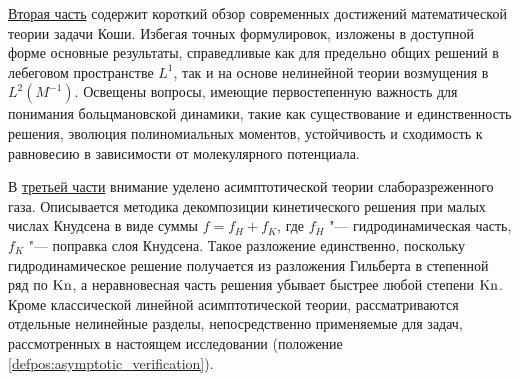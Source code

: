 \underline{Вторая часть} содержит короткий обзор современных достижений математической теории задачи Коши.
Избегая точных формулировок, изложены в доступной форме основные результаты,
справедливые как для предельно общих решений в лебеговом пространстве \(L^1\),
так и на основе нелинейной теории возмущения в \(L^2(M^{-1})\).
Освещены вопросы, имеющие первостепенную важность для понимания больцмановской динамики, такие как
существование и единственность решения, эволюция полиномиальных моментов,
устойчивость и сходимость к равновесию в зависимости от молекулярного потенциала.

В \underline{третьей части} внимание уделено асимптотической теории слаборазреженного газа.
Описывается методика декомпозиции кинетического решения при малых числах Кнудсена
в виде суммы \(f=f_H+f_K\), где \(f_H\) "--- гидродинамическая часть, \(f_K\) "--- поправка слоя Кнудсена.
Такое разложение единственно, поскольку гидродинамическое решение получается из разложения Гильберта в степенной ряд
по \(\mathrm{Kn}\), а неравновесная часть решения убывает быстрее любой степени \(\mathrm{Kn}\).
Кроме классической линейной асимптотической теории, рассматриваются отдельные нелинейные разделы,
непосредственно применяемые для задач, рассмотренных в настоящем исследовании
(положение \ref{defpos:asymptotic_verification}).

